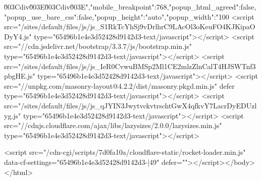 \u003C\/div\u003E\n\u003C\/div\u003E","mobile_breakpoint":768,"popup_html_agreed":false,"popup_use_bare_css":false,"popup_height":"auto","popup_width":"100%
<script src="/sites/default/files/js/js_S1RkTcYhSj9vDrlhrC9LAcOl3oKeuFO4KJKipaODyY4.js" type="65496b1e4e3d52428d9142d3-text/javascript"></script>
<script src="//cdn.jsdelivr.net/bootstrap/3.3.7/js/bootstrap.min.js" type="65496b1e4e3d52428d9142d3-text/javascript"></script>
<script src="/sites/default/files/js/js_IeR0CvwuBMSp2Ml1CE2mlzZlnCalT4HJSWTnf3pbgHE.js" type="65496b1e4e3d52428d9142d3-text/javascript"></script>
<script src="//unpkg.com/masonry-layout@4.2.2/dist/masonry.pkgd.min.js" defer type="65496b1e4e3d52428d9142d3-text/javascript"></script>
<script src="/sites/default/files/js/js_qJYIN3JwytvckvtrschtGwX4qfkvY7LacrDyEDUzlyg.js" type="65496b1e4e3d52428d9142d3-text/javascript"></script>
<script src="//cdnjs.cloudflare.com/ajax/libs/lazysizes/2.0.0/lazysizes.min.js" type="65496b1e4e3d52428d9142d3-text/javascript"></script>

  <script src="/cdn-cgi/scripts/7d0fa10a/cloudflare-static/rocket-loader.min.js" data-cf-settings="65496b1e4e3d52428d9142d3-|49" defer=""></script></body>
</html>
